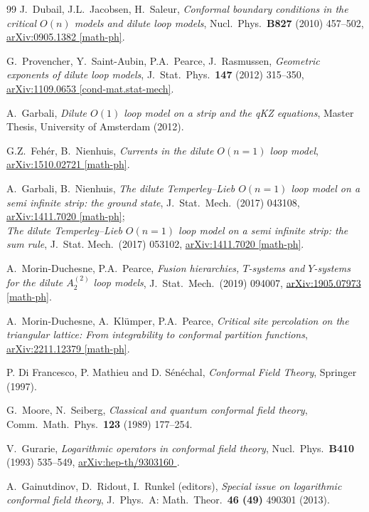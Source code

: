 \documentclass[11pt]{article}
\numberwithin{equation}{section}
\theoremstyle{definition}
\numberwithin{equation}{section}
\def\arxiv#1#2{\href{http://arxiv.org/abs/#1}{\textsf{arXiv:#1 #2}}}
\begin{document}
\begin{thebibliography}{99}
	J.~Dubail, J.L.~Jacobsen, H.~Saleur, 
	{\em Conformal boundary conditions in the critical $O(n)$ models and dilute loop models}, 
	Nucl.~Phys.~{\bf B827} (2010) 457--502,
	\arxiv{0905.1382}{[math-ph]}.
	
	G.~Provencher, Y.~Saint-Aubin, P.A.~Pearce, J.~Rasmussen, 
	{\em Geometric exponents of dilute loop models}, 
	J.~Stat.~Phys.~{\bf 147} (2012) 315--350,
	\arxiv{1109.0653}{[cond-mat.stat-mech]}.

	A.~Garbali,
	{\em Dilute $O(1)$ loop model on a strip and the qKZ equations},	
	Master Thesis, University of Amsterdam (2012).

	G.Z.~Feh\'er, B.~Nienhuis,
	{\em Currents in the dilute $O(n\!=\!1)$ loop model}, 
	\arxiv{1510.02721}{[math-ph]}.
	
	A.~Garbali, B.~Nienhuis,
	{\em The dilute Temperley--Lieb $O(n\!=\!1)$ loop model on a semi infinite strip: the ground state}, 
	J.~Stat.~Mech.~(2017) 043108, 
	\arxiv{1411.7020}{[math-ph]};\\
	{\em The dilute Temperley--Lieb $O(n\!=\!1)$ loop model on a semi infinite strip: the sum rule}, 
	J.~Stat. Mech.~(2017) 053102,
	\arxiv{1411.7020}{[math-ph]}.

	A.~Morin-Duchesne, P.A.~Pearce, 
	{\em Fusion hierarchies, $T$-systems and $Y$-systems for the dilute $A_2^{(2)}$ loop models}, 
	J.~Stat.~Mech.~(2019) 094007,
	\arxiv{1905.07973}{[math-ph]}.	

	A.~Morin-Duchesne, A.~Kl\"umper, P.A.~Pearce, 
	{\em Critical site percolation on the triangular lattice: From integrability to conformal partition functions}, 
	\arxiv{2211.12379}{[math-ph]}.
	

	P. Di Francesco, P. Mathieu and D. S\'en\'echal, 
	{\em Conformal Field Theory},
	Springer (1997).
	
	G.~Moore, N.~Seiberg, 
	{\em Classical and quantum conformal field theory}, 
	Comm.~Math.~Phys.~{\bf 123} (1989) 177--254.
	
	V.~Gurarie, 
	{\em Logarithmic operators in conformal field theory},
	Nucl.~Phys.~{\bf B410} (1993) 535--549,
	\arxiv{hep-th/9303160}{\!\!}.

	A.~Gainutdinov, D.~Ridout, I.~Runkel (editors),
	{\em Special issue on logarithmic conformal field theory}, 
	J.~Phys.~A: Math.~Theor.~{\bf 46 (49)} 490301 (2013).
	

\end{thebibliography}
\end{document}
